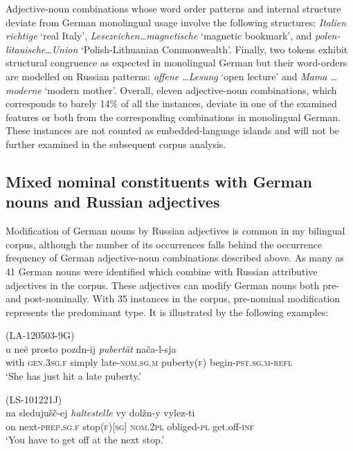 Adjective-noun combinations whose word order patterns and internal structure deviate from German monolingual usage involve the following structures: \textit{Italien richtige} `real Italy', \textit{Lesezeichen\dots magnetische} `magnetic bookmark', and \textit{polen-litauische}\dots \textit{Union} `Polish-Lithuanian Commonwealth'. Finally, two tokens exhibit structural congruence as expected in monolingual German but their word-orders are modelled on Russian patterns: \textit{offene \dots Lesung} `open lecture' and \textit{Mama \dots moderne} `modern mother'. Overall, eleven adjective-noun combinations, which corresponds to barely 14\% of all the instances, deviate in one of the examined features or both from the corresponding combinations in monolingual German. These instances are not counted as embedded-language islands and will not be further examined in the subsequent corpus analysis. 

\subsection{Mixed nominal constituents with German nouns and Russian adjectives}

Modification of German nouns by Russian adjectives is common in my bilingual corpus, although the number of its occurrences falls behind the occurrence frequency of German adjective-noun combinations described above. As many as 41 German nouns were identified which combine with Russian attributive adjectives in the corpus. These adjectives can modify German nouns both pre- and post-nominally. With 35 instances in the corpus, pre-nominal modification represents the predominant type. It is illustrated by the following examples:

\ea 
\label{ex:4:37}
(LA-120503-9G)\\
    \gll u neë prosto pozdn-ij \textit{pubertät}  nača-l-sja\\
    with	\textsc{gen.3sg.f} 	simply late-\textsc{nom.sg.m}  puberty(\textsc{f})  begin-\textsc{pst.sg.m-refl}\\
\glt `She has just hit a late puberty.'
\z

\ea 
\label{ex:4:38}
(LS-101221J)\\
    \gll na sledujušč-ej \textit{haltestelle}  vy dolžn-y vylez-ti\\
    on	next-\textsc{prep.sg.f} 	stop\textsc{(f)[sg]}	 \textsc{nom.2pl} 	obliged-\textsc{pl} get.off-\textsc{inf}\\
\glt `You have to get off at the next stop.'
\z

